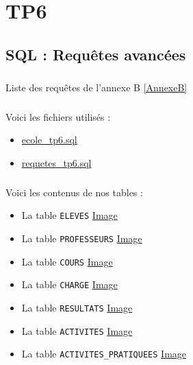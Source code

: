 \documentclass{report}
\begin{document}

\chapter{TP6}

\section{SQL : Requêtes avancées}

\paragraph{}Liste des requêtes de l'annexe B \autoref{AnnexeB}

\paragraph{}Voici les fichiers utilisés :
\begin{itemize}
	\item \href{./TP6/ecole_tp6.sql}{ecole\_tp6.sql}
	\item \href{./TP6/requetes_tp6.sql}{requetes\_tp6.sql}
\end{itemize}

\paragraph{}Voici les contenus de nos tables :
\begin{itemize}
	\item La table {\tt ELEVES} \href{run:./Images/TP6/eleves.png}{Image}
	\item La table {\tt PROFESSEURS} \href{run:./Images/TP6/professeurs.png}{Image}
	\item La table {\tt COURS} \href{run:./Images/TP6/cours.png}{Image}
	\item La table {\tt CHARGE} \href{run:./Images/TP6/charge.png}{Image}
	\item La table {\tt RESULTATS} \href{run:./Images/TP6/resultats.png}{Image}
	\item La table {\tt ACTIVITES} \href{run:./Images/TP6/activites.png}{Image}
	\item La table {\tt ACTIVITES\_PRATIQUEES} \href{run:./Images/TP6/activites_pratiquees.png}{Image}
\end{itemize}
\end{document}
